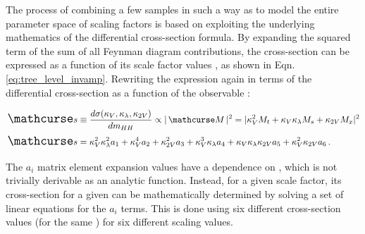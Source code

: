     The process of combining a few samples in such a way as to model the entire parameter space of scaling factors
        is based on exploiting the underlying mathematics of the differential cross-section formula.
    By expanding the squared term of the sum of all Feynman diagram contributions,
        the cross-section can be expressed as a function of its scale factor values \cite{ATLAS-CONF-2019-049},
        as shown in Eqn. \ref{eq:tree_level_invamp}.
    Rewriting the expression again in terms of the differential cross-section as a function of the observable \mhh:

    \begin{equation} \begin{split} \label{eq:tree_level_invamp_simple}
        \xsec &\equiv \dXsecM \propto |\invAmp|^2 = |  \kv^2 M_t + \kv \kl M_s + \kvv M_x |^2 \\
        \xsec &= \kv^2 \kl^2 a_1 + \kv^4 a_2 + \kvv^2 a_3 + \kv^3 \kl a_4 + \kv \kl \kvv a_5 + \kv^2 \kvv a_6
        \,.
    \end{split} \end{equation}

    The $a_i$ matrix element expansion values have a dependence on \mhh, which is not trivially derivable as an analytic function.
    Instead, for a given scale factor,
        its cross-section for a given \mhh can be mathematically determined by solving a set of linear equations for the $a_i$ terms.
    This is done using six different cross-section values (for the same \mhh) for six different scaling values.

    \newcommand{\crossterm}[1]{
        \xsec_{#1} &= \fkv{#1}^2 \fkl{#1}^2 a_1
            + \fkv{#1}^4 a_2
            + \fkvv{#1}^2 a_3
            + \fkv{#1}^3 \fkl{#1} a_4
            + \fkv{#1} \fkl{#1} \fkvv{#1} a_5
            + \fkv{#1}^2 \fkvv{#1} a_6
    }
    \newcommand{\combterm}[1]{ g_{#1} \xsec_{#1} }

